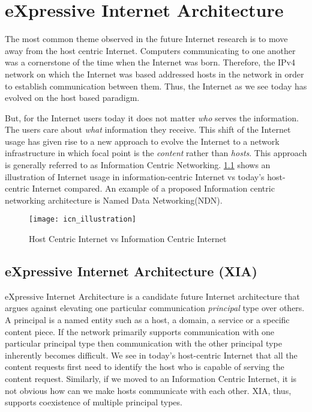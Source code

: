\chapter{eXpressive Internet Architecture}
\label{chap:ccnxia}

The most common theme observed in the future Internet research is to
move away from the host centric Internet. Computers communicating to
one another was a cornerstone of the time when the Internet was
born. Therefore, the IPv4 network on which the Internet was based
addressed hosts in the network in order to establish communication
between them. Thus, the Internet as we see today has evolved on the
host based paradigm.

But, for the Internet users today it does not matter \emph{who} serves
the information. The users care about \emph{what} information they
receive. This shift of the Internet usage has given rise to a new
approach to evolve the Internet to a network infrastructure in which
focal point is the \emph{content} rather than \emph{hosts}. This
approach is generally referred to as Information Centric
Networking. \ref{fig:icn_illustration} shows an illustration of
Internet usage in information-centric Internet vs today's host-centric
Internet compared. An example of a proposed Information centric
networking architecture is Named Data Networking(NDN).

\begin{figure}
  \begin{center}
    \texttt{[image: icn\_illustration]}
    \caption{Host Centric Internet vs Information Centric Internet}
    \label{fig:icn_illustration}
  \end{center}
\end{figure}

\section{eXpressive Internet Architecture (XIA)}
eXpressive Internet Architecture is a candidate future Internet
architecture that argues against elevating one particular
communication \emph{principal} type over others. A principal is a
named entity such as a host, a domain, a service or a specific content
piece. If the network primarily supports communication with one
particular principal type then communication with the other principal
type inherently becomes difficult. We see in today's host-centric
Internet that all the content requests first need to identify the host
who is capable of serving the content request. Similarly, if we moved
to an Information Centric Internet, it is not obvious how can we make
hosts communicate with each other. XIA, thus, supports coexistence of
multiple principal types.

